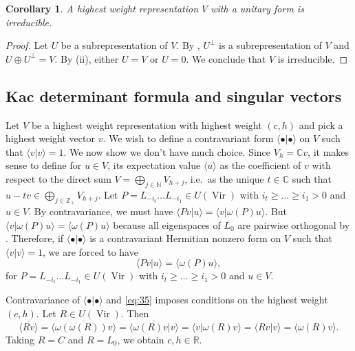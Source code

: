 \documentclass[a4paper, 12pt, reqno]{amsart}
\newtheorem{corollary}[theorem]{Corollary}
\theoremstyle{remark}
\numberwithin{equation}{subsection}
\DeclareMathOperator{\Vir}{Vir}
\begin{document}
\begin{corollary}
  \label{crl:2}
  A highest weight representation $V$ with a unitary form is irreducible.
\end{corollary}

\begin{proof}
  Let $U$ be a subrepresentation of $V$.
  By , $U^{\perp}$ is a subrepresentation of $V$ and $U\oplus U^{\perp} = V$.
  By (ii), either $U = V$ or $U = 0$.
  We conclude that $V$ is irreducible.
\end{proof}

\subsection{Kac determinant formula and singular vectors}
\label{sec:kac-dete-form}

Let $V$ be a highest weight representation with highest weight $(c, h)$ and pick a highest weight vector $v$.
We wish to define a contravariant form $\langle \bullet| \bullet\rangle$ on $V$ such that $\langle v| v\rangle = 1$.
We now show we don't have much choice.
Since $V_h = \mathbb{C}v$, it makes sense to define for $u \in V$, its expectation value $\langle u\rangle$ as the coefficient of $v$ with respect to the direct sum $V = \bigoplus_{j \in \mathbb{N}}V_{h + j}$, i.e.\ as the unique $t \in \mathbb{C}$ such that $u - tv \in \bigoplus_{j \in \mathbb{Z}_+}V_{h + j}$.
Let $P = L_{-i_t}\dots L_{-i_1} \in U(\Vir)$ with $i_t \ge \dots \ge i_1 > 0$ and $u \in V$.
By contravariance, we must have $\langle Pv| u\rangle = \langle v| \omega(P)u\rangle$.
But $\langle v| \omega(P)u\rangle = \langle \omega(P)u\rangle$ because all eigenspaces of $L_0$ are pairwise orthogonal by .
Therefore, if $\langle \bullet| \bullet\rangle$ is a contravariant Hermitian nonzero form on $V$ such that $\langle v| v\rangle = 1$, we are forced to have
\begin{equation}
  \label{eq:35}
  \langle Pv| u\rangle = \langle \omega(P)u\rangle,
\end{equation}
for $P = L_{-i_t} \dots L_{-i_1} \in U(\Vir)$ with $i_t \ge \dots \ge i_1 > 0$ and $u \in V$.

Contravariance of $\langle \bullet| \bullet\rangle$ and \eqref{eq:35} imposes conditions on the highest weight $(c, h)$.
Let $R\in U(\Vir)$.
Then
\begin{equation*}
  \overline{\langle Rv\rangle} = \overline{\langle \omega(\omega(R))v\rangle} = \overline{\langle \omega(R)v| v\rangle} = \langle v| \omega(R)v\rangle = \langle Rv| v\rangle = \langle \omega(R)v\rangle.
\end{equation*}
Taking $R = C$ and $R = L_0$, we obtain $c, h \in \mathbb{R}$.
\end{document}
